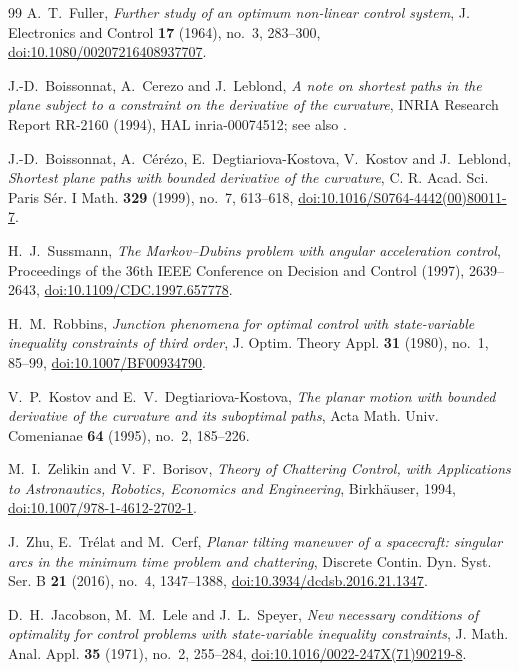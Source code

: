 \documentclass[11pt,reqno]{amsart}
\theoremstyle{definition}
\numberwithin{equation}{section}
\begin{document}
\begin{thebibliography}{99}
A.~T.~Fuller,
\emph{Further study of an optimum non-linear control system},
J. Electronics and Control \textbf{17} (1964), no.~3, 283--300, \href{https://doi.org/10.1080/00207216408937707}{doi:10.1080/00207216408937707}.

J.-D.~Boissonnat, A.~Cerezo and J.~Leblond,
\emph{A note on shortest paths in the plane subject to a constraint on the derivative of the curvature},
INRIA Research Report RR-2160 (1994), HAL inria-00074512; see also \cite{bcl1999}.

J.-D.~Boissonnat, A.~C\'er\'ezo, E.~Degtiariova-Kostova, V.~Kostov and J.~Leblond,
\emph{Shortest plane paths with bounded derivative of the curvature},
C. R. Acad. Sci. Paris S\'er. I Math. \textbf{329} (1999), no.~7, 613--618, \href{https://doi.org/10.1016/S0764-4442(00)80011-7}{doi:10.1016/S0764-4442(00)80011-7}.

H.~J.~Sussmann,
\emph{The Markov--Dubins problem with angular acceleration control},
Proceedings of the 36th IEEE Conference on Decision and Control (1997), 2639--2643, \href{https://doi.org/10.1109/CDC.1997.657778}{doi:10.1109/CDC.1997.657778}.

H.~M.~Robbins,
\emph{Junction phenomena for optimal control with state-variable inequality constraints of third order},
J. Optim. Theory Appl. \textbf{31} (1980), no.~1, 85--99, \href{https://doi.org/10.1007/BF00934790}{doi:10.1007/BF00934790}.

V.~P.~Kostov and E.~V.~Degtiariova-Kostova,
\emph{The planar motion with bounded derivative of the curvature and its suboptimal paths},
Acta Math. Univ. Comenianae \textbf{64} (1995), no.~2, 185--226.

M.~I.~Zelikin and V.~F.~Borisov,
\emph{Theory of Chattering Control, with Applications to Astronautics, Robotics, Economics and Engineering},
Birkh\"auser, 1994, \href{https://doi.org/10.1007/978-1-4612-2702-1}{doi:10.1007/978-1-4612-2702-1}.

J.~Zhu, E.~Tr\'elat and M.~Cerf,
\emph{Planar tilting maneuver of a spacecraft: singular arcs in the minimum time problem and chattering},
Discrete Contin. Dyn. Syst. Ser. B \textbf{21} (2016), no.~4, 1347--1388, \href{https://doi.org/10.3934/dcdsb.2016.21.1347}{doi:10.3934/dcdsb.2016.21.1347}.

D.~H.~Jacobson, M.~M.~Lele and J.~L.~Speyer,
\emph{New necessary conditions of optimality for control problems with state-variable inequality constraints},
J. Math. Anal. Appl. \textbf{35} (1971), no.~2, 255--284, \href{https://doi.org/10.1016/0022-247X(71)90219-8}{doi:10.1016/0022-247X(71)90219-8}.


\end{thebibliography}
\end{document}
